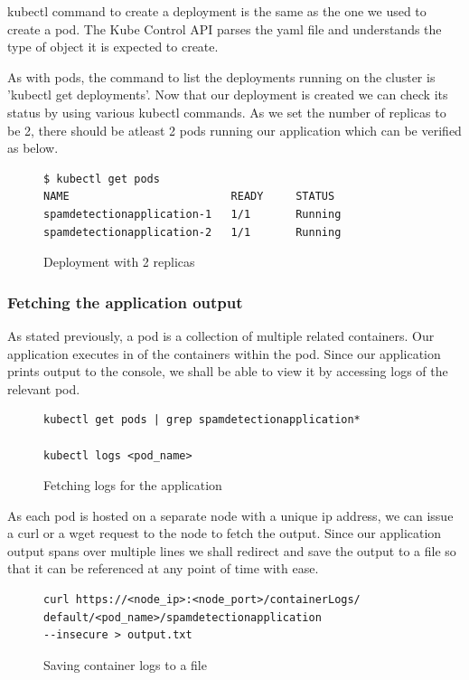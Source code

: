 \documentclass[9pt,twocolumn,twoside]{../../styles/osajnl}
\begin{document}
kubectl command to create a deployment is the same as the one we used
to create a pod. The Kube Control API parses the yaml file and
understands the type of object it is expected to create.

As with pods, the command to list the deployments running on the
cluster is 'kubectl get deployments'. Now that our deployment is
created we can check its status by using various kubectl commands. As
we set the number of replicas to be 2, there should be atleast 2 pods
running our application which can be verified as below.

\begin{figure}[H]
\begin{verbatim}
$ kubectl get pods
NAME                         READY     STATUS        
spamdetectionapplication-1   1/1       Running  
spamdetectionapplication-2   1/1       Running
\end{verbatim}
\caption{Deployment with 2 replicas}
\label{Deployment with 2 replicas}
\end{figure}

\subsubsection{Fetching the application output}
As stated previously, a pod is a collection of multiple related
containers. Our application executes in of the containers within the
pod. Since our application prints output to the console, we shall be
able to view it by accessing logs of the relevant pod.

\begin{figure}[H]
\begin{verbatim}
kubectl get pods | grep spamdetectionapplication*

kubectl logs <pod_name>
\end{verbatim}
\caption{Fetching logs for the application}
\vspace{-4mm}
\label{Fetching logs for the application}
\end{figure}

As each pod is hosted on a separate node with a unique ip address, we
can issue a curl or a wget request to the node to fetch the output.
Since our application output spans over multiple lines we shall
redirect and save the output to a file so that it can be referenced at
any point of time with ease.
\begin{figure}[H]
\begin{verbatim}
curl https://<node_ip>:<node_port>/containerLogs/
default/<pod_name>/spamdetectionapplication 
--insecure > output.txt
\end{verbatim}
\caption{Saving container logs to a file}
\vspace{-4mm}
\label{Saving container logs to a file}
\end{figure}
\end{document}
